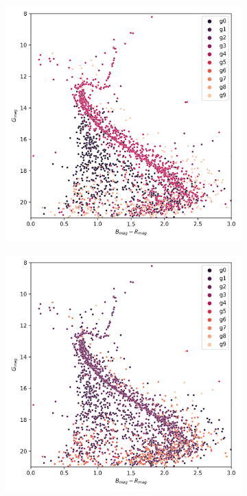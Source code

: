\documentclass[preprint,12pt,authoryear]{elsarticle}
\begin{document}
\begin{figure}[!hbt]
  \begin{subfigure}{0.29\textwidth}
    \includegraphics[width=\textwidth]{../figures/ngc_2682/kmeans_hr_diagram_ngc_2682.png}
  \end{subfigure}
  \begin{subfigure}{0.29\textwidth}
    \includegraphics[width=\textwidth]{../figures/ngc_2682/dec_hr_diagram_ngc_2682.png}

\end{subfigure}
\end{figure}
\end{document}
